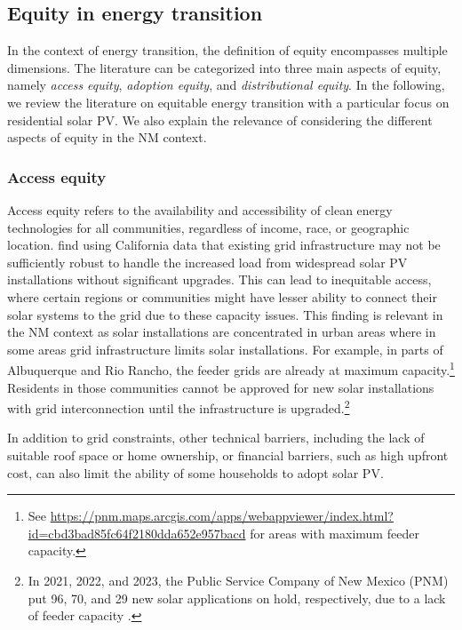 \documentclass[12pt,twoside,letterpaper]{article}
\begin{document}
\subsection{Equity in energy transition}
\label{section:equity}

In the context of energy transition, the definition of equity encompasses multiple dimensions. The literature can be categorized into three main aspects of equity, namely \textit{access equity}, \textit{adoption equity}, and \textit{distributional equity}. In the following, we review the literature on equitable energy transition with a particular focus on residential solar PV. We also explain the relevance of considering the different aspects of equity in the NM context.

\subsubsection{Access equity}

 Access equity refers to the availability and accessibility of clean energy technologies for all communities, regardless of income, race, or geographic location. \textcite{brockway_inequitable_2021} find using California data that existing grid infrastructure may not be sufficiently robust to handle the increased load from widespread solar PV installations without significant upgrades. This can lead to inequitable access, where certain regions or communities might have lesser ability to connect their solar systems to the grid due to these capacity issues. This finding is relevant in the NM context as solar installations are concentrated in urban areas where in some areas grid infrastructure limits solar installations. For example, in parts of Albuquerque and Rio Rancho, the feeder grids are already at maximum capacity.\footnote{See \url{https://pnm.maps.arcgis.com/apps/webappviewer/index.html?id=cbd3bad85fc64f2180dda652e957bacd} for areas with maximum feeder capacity.} Residents in those communities cannot be approved for new solar installations with grid interconnection until the infrastructure is upgraded.\footnote{In 2021, 2022, and 2023, the Public Service Company of New Mexico (PNM) put 96, 70, and 29 new solar applications on hold, respectively, due to a lack of feeder capacity \parencite{pnm2021,pnm2022,pnm2023}. }

 In addition to grid constraints, other technical barriers, including the lack of suitable roof space or home ownership, or financial barriers, such as high upfront cost, can also limit the ability of some households to adopt solar PV.
 
\end{document}
